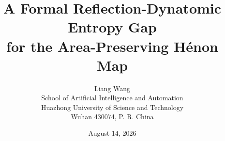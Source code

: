 \documentclass[11pt]{article}
\title{A Formal Reflection-Dynatomic Entropy Gap\\
for the Area-Preserving H\'enon Map}
\author{Liang Wang\\
\small School of Artificial Intelligence and Automation\\[-1mm]
\small Huazhong University of Science and Technology\\[-1mm]
\small Wuhan 430074, P. R. China}
\date{August 14, 2026}
\theoremstyle{remark}
\begin{document}
\maketitle











\renewcommand{\bibfont}{\small}



\appendix

\end{document}
